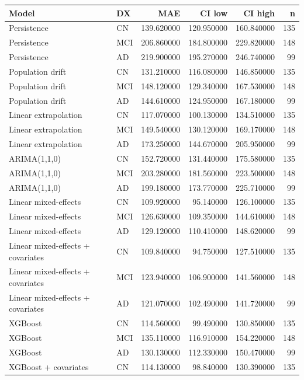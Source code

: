 \begin{tabular}{llrrrr}
\toprule
Model & DX & MAE & CI low & CI high & n \\
\midrule
Persistence & CN & 139.620000 & 120.950000 & 160.840000 & 135 \\
Persistence & MCI & 206.860000 & 184.800000 & 229.820000 & 148 \\
Persistence & AD & 219.900000 & 195.270000 & 246.740000 & 99 \\
Population drift & CN & 131.210000 & 116.080000 & 146.850000 & 135 \\
Population drift & MCI & 148.120000 & 129.340000 & 167.530000 & 148 \\
Population drift & AD & 144.610000 & 124.950000 & 167.180000 & 99 \\
Linear extrapolation & CN & 117.070000 & 100.130000 & 134.510000 & 135 \\
Linear extrapolation & MCI & 149.540000 & 130.120000 & 169.170000 & 148 \\
Linear extrapolation & AD & 173.250000 & 144.670000 & 205.950000 & 99 \\
ARIMA(1,1,0) & CN & 152.720000 & 131.440000 & 175.580000 & 135 \\
ARIMA(1,1,0) & MCI & 203.280000 & 181.560000 & 223.500000 & 148 \\
ARIMA(1,1,0) & AD & 199.180000 & 173.770000 & 225.710000 & 99 \\
Linear mixed-effects & CN & 109.920000 & 95.140000 & 126.100000 & 135 \\
Linear mixed-effects & MCI & 126.630000 & 109.350000 & 144.610000 & 148 \\
Linear mixed-effects & AD & 129.120000 & 110.410000 & 148.620000 & 99 \\
Linear mixed-effects + covariates & CN & 109.840000 & 94.750000 & 127.510000 & 135 \\
Linear mixed-effects + covariates & MCI & 123.940000 & 106.900000 & 141.560000 & 148 \\
Linear mixed-effects + covariates & AD & 121.070000 & 102.490000 & 141.720000 & 99 \\
XGBoost & CN & 114.560000 & 99.490000 & 130.850000 & 135 \\
XGBoost & MCI & 135.110000 & 116.910000 & 154.220000 & 148 \\
XGBoost & AD & 130.130000 & 112.330000 & 150.470000 & 99 \\
XGBoost + covariates & CN & 114.130000 & 98.840000 & 130.390000 & 135 \\

\end{tabular}
